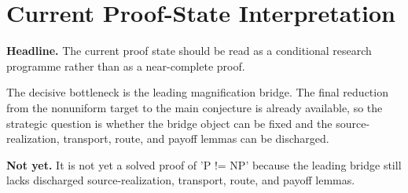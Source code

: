 \documentclass[11pt]{article}
\begin{document}
\section{Current Proof-State Interpretation}
\textbf{Headline.} The current proof state should be read as a conditional research programme rather than as a near-complete proof.

The decisive bottleneck is the leading magnification bridge. The final reduction from the nonuniform target to the main conjecture is already available, so the strategic question is whether the bridge object can be fixed and the source-realization, transport, route, and payoff lemmas can be discharged.

\textbf{Not yet.} It is not yet a solved proof of 'P != NP' because the leading bridge still lacks discharged source-realization, transport, route, and payoff lemmas.
\end{document}
